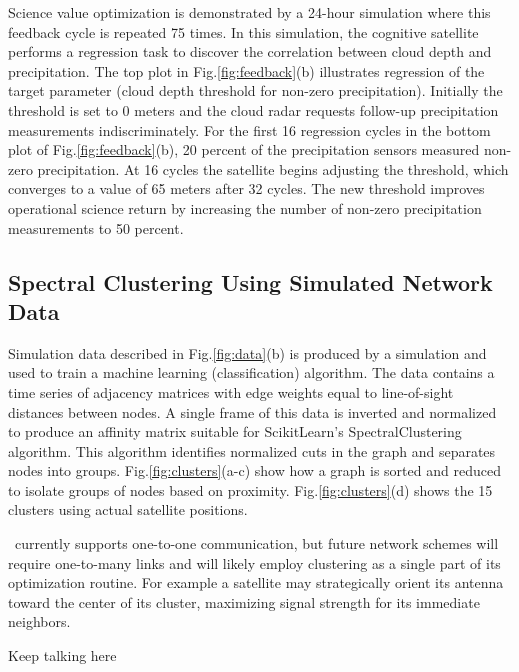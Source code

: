 \documentclass[conference]{IEEEtran}
\newcommand{\project}{{\sc{Collaborate}}~}
\begin{document}
Science value optimization is demonstrated by a 24-hour simulation where this feedback cycle is repeated 75 times.  In this simulation, the cognitive satellite performs a regression task to discover the correlation between cloud depth and precipitation.  The top plot in Fig.\ref{fig:feedback}(b) illustrates regression of the target parameter (cloud depth threshold for non-zero precipitation).  Initially the threshold is set to 0 meters and the cloud radar requests follow-up precipitation measurements indiscriminately.  For the first 16 regression cycles in the bottom plot of Fig.\ref{fig:feedback}(b), 20 percent of the precipitation sensors measured non-zero precipitation.  At 16 cycles the satellite begins adjusting the threshold, which converges to a value of 65 meters after 32 cycles.  The new threshold improves operational science return by increasing the number of non-zero precipitation measurements to 50 percent.

\subsection{Spectral Clustering Using Simulated Network Data}
\label{ssec:cluster}

Simulation data described in Fig.\ref{fig:data}(b) is produced by a simulation and used to train a machine learning (classification) algorithm.  The data contains a time series of adjacency matrices with edge weights equal to line-of-sight distances between nodes.  A single frame of this data is inverted and normalized to produce an affinity matrix suitable for ScikitLearn's SpectralClustering algorithm.  This algorithm identifies normalized cuts in the graph and separates nodes into groups.  Fig.\ref{fig:clusters}(a-c) show how a graph is sorted and reduced to isolate groups of nodes based on proximity.  Fig.\ref{fig:clusters}(d) shows the 15 clusters using actual satellite positions.

\project currently supports one-to-one communication, but future network schemes will require one-to-many links and will likely employ clustering as a single part of its optimization routine.  For example a satellite may strategically orient its antenna toward the center of its cluster, maximizing signal strength for its immediate neighbors.

{ \color{red} Keep talking here }
\end{document}
